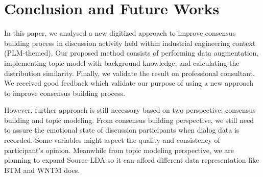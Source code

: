 \documentclass[10pt, conference, compsocconf]{IEEEtran}
\begin{document}
\section{Conclusion and Future Works}
In this paper, we analysed a new digitized approach to improve consensus building process in discussion activity held within industrial engineering context (PLM-themed). Our proposed method consists of performing data augmentation, implementing topic model with background knowledge, and calculating the distribution similarity. Finally, we validate the result on professional consultant. We received good feedback which validate our purpose of using a new approach to improve consensus building process.

However, further approach is still necessary based on two perspective: consensus building and topic modeling. From consensus building perspective, we still need to assure the emotional state of discussion participants when dialog data is recorded. Some variables might aspect the quality and consistency of participant's opinion. Meanwhile from topic modeling perspective, we are planning to expand Source-LDA so it can afford different data representation like BTM and WNTM does.
%
%

\end{document}
